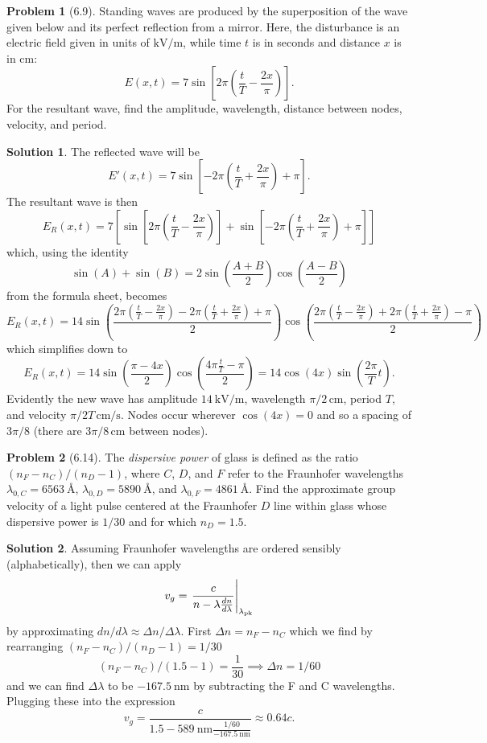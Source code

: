 \documentclass[10pt]{article}
\theoremstyle{definition}
\newtheorem{problem}{Problem}
\newtheorem{soln}{Solution}
\begin{document}
\begin{problem}[6.9]
Standing waves are produced by the superposition of the wave given below and its perfect reflection from a mirror. Here, the disturbance is an electric field given in units of
$\unit{\kilo\volt\per\meter}$, while time $t$ is in seconds and distance $x$ is in $\unit{\centi\meter}$:
$$E(x,t)=7\sin\left[2\pi\left(\frac{t}{T}-\frac{2x}{\pi}\right)\right].$$
For the resultant wave, find the amplitude, wavelength, distance between nodes, velocity, and period.
\end{problem}
\begin{soln}
  The reflected wave will be
  $$E'(x,t)=7\sin\left[-2\pi\left(\frac{t}{T}+\frac{2x}{\pi}\right)+\pi\right].$$
  The resultant wave is then
  $$E_R(x,t)=7\left[\sin\left[2\pi\left(\frac{t}{T}-\frac{2x}{\pi}\right)\right]+\sin\left[-2\pi\left(\frac{t}{T}+\frac{2x}{\pi}\right)+\pi\right]\right]$$
  which, using the identity
  $$\sin(A)+\sin(B)=2\sin(\frac{A+B}{2})\cos(\frac{A-B}{2})$$
  from the formula sheet, becomes
  $$E_R(x,t)=14
    \sin(\frac{2\pi\left(\frac{t}{T}-\frac{2x}{\pi}\right)-2\pi\left(\frac{t}{T}+\frac{2x}{\pi}\right)+\pi}{2})
    \cos(\frac{2\pi\left(\frac{t}{T}-\frac{2x}{\pi}\right)+2\pi\left(\frac{t}{T}+\frac{2x}{\pi}\right)-\pi}{2})$$
  which simplifies down to
  $$E_R(x,t)=14
    \sin(\frac{\pi-4x}{2})
    \cos(\frac{4\pi\frac{t}{T}-\pi}{2})=14\cos(4x)\sin(\frac{2\pi}{T}t).$$
  Evidently the new wave has amplitude $\qty{14}{\kilo\volt\per\meter}$, wavelength $\pi/2\,\unit{\centi\meter}$, period $T$, and velocity $\pi/2T\,\unit{\centi\meter\per\second}$.
  Nodes occur wherever $\cos(4x)=0$ and so a spacing of $3\pi/8$ (there are $3\pi/8\,\unit{\centi\meter}$ between nodes).
\end{soln}

\begin{problem}[6.14]
The \emph{dispersive power} of glass is defined as the ratio $(n_F-n_C)/(n_D-1)$, where $C$, $D$, and $F$ refer to the
Fraunhofer wavelengths $\lambda_{0,C}=\qty{6563}{\angstrom}$, $\lambda_{0,D}=\qty{5890}{\angstrom}$, and $\lambda_{0,F}=\qty{4861}{\angstrom}$.
Find the approximate group velocity of a light pulse centered at the Fraunhofer $D$ line within glass whose dispersive power is $1/30$
and for which $n_D=1.5$.
\end{problem}
\begin{soln}
  Assuming Fraunhofer wavelengths are ordered sensibly (alphabetically), then we can apply
  $$v_g=\eval{\frac{c}{n-\lambda\frac{dn}{d\lambda}}}_{\lambda_{\text{pk}}}$$
  by approximating $dn/d\lambda \approx \Delta n/ \Delta \lambda$. First $\Delta n=n_F-n_C$ which we find by rearranging $(n_F-n_C)/(n_D-1)=1/30$
  $$(n_F-n_C)/(1.5-1)=\frac{1}{30}\implies \Delta n = 1/60$$
  and we can find $\Delta\lambda$ to be $\qty{-167.5}{\nano\meter}$ by subtracting the F and C wavelengths. Plugging these into the expression
  $$v_g=\frac{c}{1.5-\qty{589}{\nano\meter}\frac{1/60}{\qty{-167.5}{\nano\meter}}}\approx 0.64 c.$$
\end{soln}
\newpage
\end{document}
